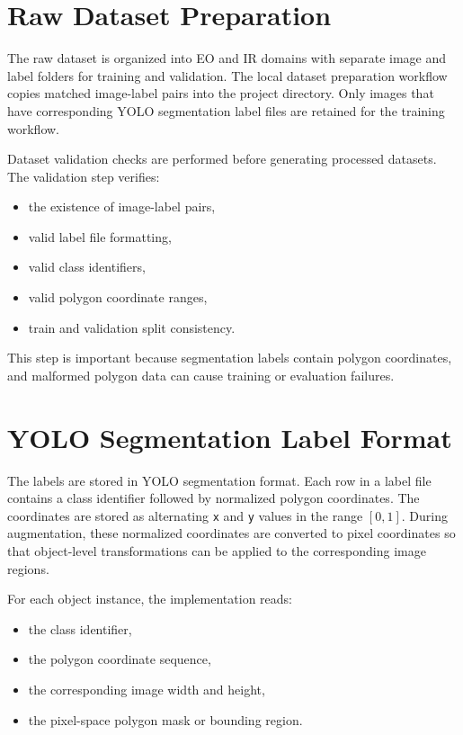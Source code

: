 \section{Raw Dataset Preparation}

The raw dataset is organized into EO and IR domains with separate image and label folders for training and validation. The local dataset preparation workflow copies matched image-label pairs into the project directory. Only images that have corresponding YOLO segmentation label files are retained for the training workflow.

Dataset validation checks are performed before generating processed datasets. The validation step verifies:

\begin{itemize}
    \item the existence of image-label pairs,
    \item valid label file formatting,
    \item valid class identifiers,
    \item valid polygon coordinate ranges,
    \item train and validation split consistency.
\end{itemize}

This step is important because segmentation labels contain polygon coordinates, and malformed polygon data can cause training or evaluation failures.

\section{YOLO Segmentation Label Format}

The labels are stored in YOLO segmentation format. Each row in a label file contains a class identifier followed by normalized polygon coordinates. The coordinates are stored as alternating \texttt{x} and \texttt{y} values in the range \([0, 1]\). During augmentation, these normalized coordinates are converted to pixel coordinates so that object-level transformations can be applied to the corresponding image regions.

For each object instance, the implementation reads:

\begin{itemize}
    \item the class identifier,
    \item the polygon coordinate sequence,
    \item the corresponding image width and height,
    \item the pixel-space polygon mask or bounding region.
\end{itemize}

